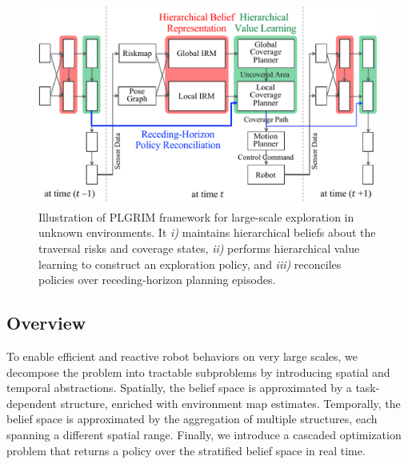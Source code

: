 \documentclass[letterpaper]{article} %
\newcommand{\phdone}[1]{} %
\begin{document}
% 	    	
%

\begin{figure}[t!]
  \centering
  \includegraphics[width=\columnwidth]{figures/diagram.pdf}
  \caption{Illustration of PLGRIM framework for large-scale exploration in unknown environments.
  It \textit{i)} maintains hierarchical beliefs about the traversal risks and coverage states,
  \textit{ii)} performs hierarchical value learning to construct an exploration policy, and 
  \textit{iii)} reconciles policies over receding-horizon planning episodes.} 
  \label{fig:framework} 
\end{figure}




\subsection{Overview}
To enable efficient and reactive robot behaviors on very large scales, we decompose the problem into tractable subproblems by introducing spatial and temporal abstractions. Spatially, the belief space is approximated by a task-dependent structure, enriched with environment map estimates. Temporally, the belief space is approximated by the aggregation of multiple structures, each spanning a different spatial range. Finally, we introduce a cascaded optimization problem that returns a policy over the stratified belief space in real time. 
\end{document}
